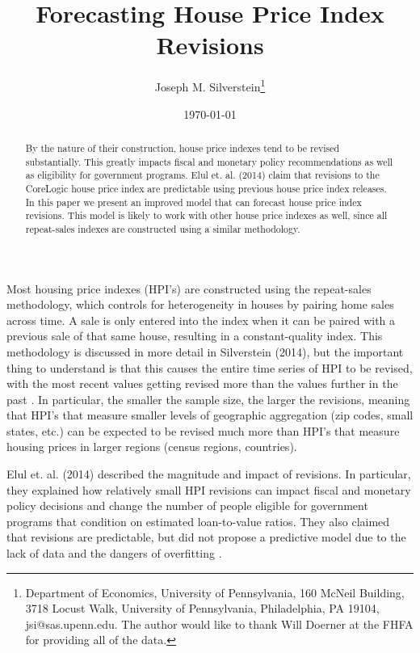 \documentclass[AER]{AEA}
\begin{document}
\title{Forecasting House Price Index Revisions}
\shortTitle{}
\author{Joseph M. Silverstein\thanks{Department of Economics, University of Pennsylvania, 160 McNeil Building, 3718 Locust Walk, University of Pennsylvania, Philadelphia, PA 19104, jsi@sas.upenn.edu. The author would like to thank Will Doerner at the FHFA for providing all of the data.}}
\date{\today}
\Keywords{}

\begin{abstract}
By the nature of their construction, house price indexes tend to be revised substantially. This greatly impacts fiscal and monetary policy recommendations as well as eligibility for government programs. Elul et. al. (2014) claim that revisions to the CoreLogic house price index are predictable using previous house price index releases. In this paper we present an improved model that can forecast house price index revisions. This model is likely to work with other house price indexes as well, since all repeat-sales indexes are constructed using a similar methodology.
\end{abstract}


\maketitle

Most housing price indexes (HPI's) are constructed using the repeat-sales methodology, which controls for heterogeneity in houses by pairing home sales  across time. A sale is only entered into the index when it can be paired with a previous sale of that same house, resulting in a constant-quality index.  This methodology is discussed in more detail in Silverstein (2014), but the important thing to understand is that this causes the entire time series of HPI to be revised, with the most recent values getting revised more than the values further in the past \cite{researchRap}. In particular, the smaller the sample size, the larger the revisions, meaning that HPI's that measure smaller levels of geographic aggregation (zip codes, small states, etc.) can be expected to be revised much more than HPI's that measure housing prices in larger regions (census regions, countries). 

Elul et. al. (2014) described the magnitude and impact of revisions. In particular, they explained how relatively small HPI revisions can impact fiscal and monetary policy decisions and change the number of people eligible for government programs that condition on estimated loan-to-value ratios. They also claimed that revisions are predictable, but did not propose a predictive model due to the lack of data and the dangers of overfitting \cite{HPIPaper}.
\end{document}

